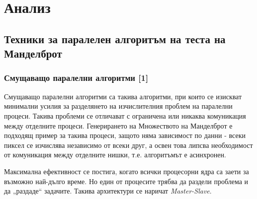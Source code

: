 \documentclass[a4paper,11pt]{article}
\begin{document}
\section{Анализ}
\subsection{Техники за паралелен алгоритъм на теста на Манделброт}
\subsubsection{Смущаващо паралелни алгоритми [1]}
Смущаващо паралелни алгоритми са такива алгоритми, при които се изискват минимални усилия за разделянето на изчислителния проблем на паралелни процеси. Такива проблеми се отличават с ограничена или никаква комуникация между отделните процеси. Генерирането на Множеството на Манделброт е подходящ пример за такива процеси, защото няма зависимост по данни - всеки пиксел се изчислява независимо от всеки друг, а освен това липсва необходимост от комуникация между отделните нишки, т.е. алгоритъмът е асинхронен.

Максимална ефективност се постига, когато всички процесорни ядра са заети за възможно най-дълго време. 
Но един от процесите трябва да раздели проблема и да „раздаде“ задачите. Такива архитектури се наричат \emph{Master-Slave}. 
\end{document}

